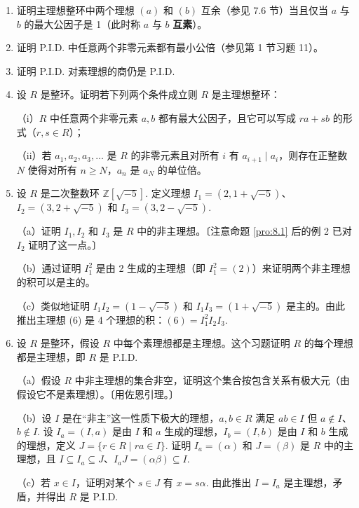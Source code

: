 \begin{enumerate}
\item 证明主理想整环中两个理想 \((a)\) 和 \((b)\) 互余（参见 7.6 节）当且仅当 \(a\) 与 \(b\) 的最大公因子是 1（此时称 \(a\) 与 \(b\) \textbf{互素}）。

\item 证明 P.I.D. 中任意两个非零元素都有最小公倍（参见第 1 节习题 11）。

\item 证明 P.I.D. 对素理想的商仍是 P.I.D.

\item 设 \(R\) 是整环。证明若下列两个条件成立则 \(R\) 是主理想整环：

（i）\(R\) 中任意两个非零元素 \(a, b\) 都有最大公因子，且它可以写成 \(ra + sb\) 的形式（\(r, s \in R\)）；

（ii）若 \(a_1, a_2, a_3, \ldots\) 是 \(R\) 的非零元素且对所有 \(i\) 有 \(a_{i+1} \mid a_i\)，则存在正整数 \(N\) 使得对所有 \(n \geq N\)，\(a_n\) 是 \(a_N\) 的单位倍。

\item 设 \(R\) 是二次整数环 \(\mathbb{Z}[\sqrt{-5}]\). 定义理想 \(I_1 = (2, 1+\sqrt{-5})\)、\(I_2 = (3, 2+\sqrt{-5})\) 和 \(I_3 = (3, 2-\sqrt{-5})\).

（a）证明 \(I_1, I_2\) 和 \(I_3\) 是 \(R\) 中的非主理想。〔注意命题 \ref{pro:8.1} 后的例 2 已对 \(I_2\) 证明了这一点。〕

（b）通过证明 \(I_1^2\) 是由 2 生成的主理想（即 \(I_1^2 = (2)\)）来证明两个非主理想的积可以是主的。

（c）类似地证明 \(I_1I_2 = (1-\sqrt{-5})\) 和 \(I_1I_3 = (1+\sqrt{-5})\) 是主的。由此推出主理想 (6) 是 4 个理想的积：\((6) = I_1^2 I_2 I_3\).

\item 设 \(R\) 是整环，假设 \(R\) 中每个素理想都是主理想。这个习题证明 \(R\) 的每个理想都是主理想，即 \(R\) 是 P.I.D.

（a）假设 \(R\) 中非主理想的集合非空，证明这个集合按包含关系有极大元（由假设它不是素理想）。〔用佐恩引理。〕

（b）设 \(I\) 是在“非主”这一性质下极大的理想，\(a, b \in R\) 满足 \(ab \in I\) 但 \(a \notin I\)、\(b \notin I\). 设 \(I_a = (I, a)\) 是由 \(I\) 和 \(a\) 生成的理想，\(I_b = (I, b)\) 是由 \(I\) 和 \(b\) 生成的理想，定义 \(J = \{r \in R \mid ra \in I\}\). 证明 \(I_a = (\alpha)\) 和 \(J = (\beta)\) 是 \(R\) 中的主理想，且 \(I \subseteq I_a \subseteq J\)、\(I_aJ = (\alpha\beta) \subseteq I\).

（c）若 \(x \in I\)，证明对某个 \(s \in J\) 有 \(x = s\alpha\). 由此推出 \(I = I_a\) 是主理想，矛盾，并得出 \(R\) 是 P.I.D.


\end{enumerate}
